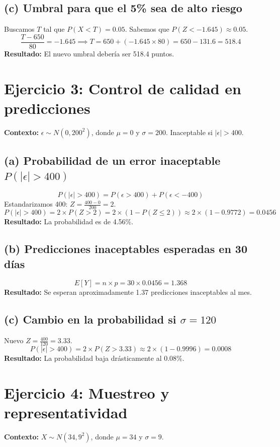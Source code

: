 \documentclass[a4paper,12pt]{article}
\begin{document}
\subsection{(c) Umbral para que el 5\% sea de alto riesgo}
Buscamos $T$ tal que $P(X < T) = 0.05$. Sabemos que $P(Z < -1.645) \approx 0.05$.
\[ \frac{T - 650}{80} = -1.645 \implies T = 650 + (-1.645 \times 80) = 650 - 131.6 = 518.4 \]
\textbf{Resultado:} El nuevo umbral debería ser 518.4 puntos.

\vspace{1em}

\newpage
\section{Ejercicio 3: Control de calidad en predicciones}
\textbf{Contexto:} $\epsilon \sim N(0, 200^2)$, donde $\mu = 0$ y $\sigma = 200$. Inaceptable si $|\epsilon| > 400$.

\subsection{(a) Probabilidad de un error inaceptable $P(|\epsilon| > 400)$}
\[ P(|\epsilon| > 400) = P(\epsilon > 400) + P(\epsilon < -400) \]
Estandarizamos 400: $Z = \frac{400 - 0}{200} = 2$.
\[ P(|\epsilon| > 400) = 2 \times P(Z > 2) = 2 \times (1 - P(Z \leq 2)) \approx 2 \times (1 - 0.9772) = 0.0456 \]
\textbf{Resultado:} La probabilidad es de 4.56\%.

\subsection{(b) Predicciones inaceptables esperadas en 30 días}
\[ E[Y] = n \times p = 30 \times 0.0456 = 1.368 \]
\textbf{Resultado:} Se esperan aproximadamente 1.37 predicciones inaceptables al mes.

\subsection{(c) Cambio en la probabilidad si $\sigma = 120$}
Nuevo $Z = \frac{400}{120} = 3.33$.
\[ P(|\epsilon| > 400) = 2 \times P(Z > 3.33) \approx 2 \times (1 - 0.9996) = 0.0008 \]
\textbf{Resultado:} La probabilidad baja drásticamente al 0.08\%.

\vspace{1em}
\newpage

\section{Ejercicio 4: Muestreo y representatividad}
\textbf{Contexto:} $X \sim N(34, 9^2)$, donde $\mu = 34$ y $\sigma = 9$.
\end{document}

